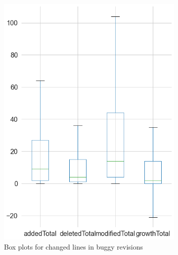 \begin{figure}[H]
	\begin{subfigure}{0.5\textwidth}
		\centering
		\includegraphics[scale=0.3]{./src/data_analysis/buggy_box_lines.png}
		\caption{Box plots for changed lines in buggy revisions}
	\end{subfigure}
	\caption{}
	\label{box:changed_lines}
\end{figure}

